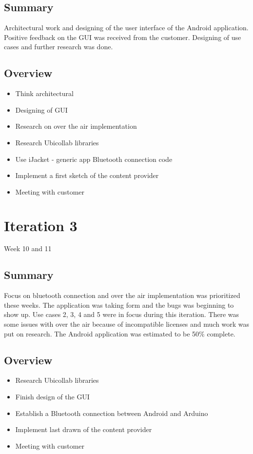 \subsection{Summary}
	Architectural work and designing of the user interface of the Android application. Positive feedback on the GUI was received from the customer. Designing of use cases and further research was done.
\subsection{Overview}
\begin{itemize}
	\item{Think architectural}
	\item{Designing of GUI}
	\item{Research on over the air implementation}
	\item{Research Ubicollab libraries}
	\item{Use iJacket - generic app Bluetooth connection code}
	\item{Implement a first sketch of the content provider}
	\item{Meeting with customer}
\end{itemize}

\section{Iteration 3}
Week 10 and 11
\subsection{Summary}
	Focus on bluetooth connection and over the air implementation was prioritized these weeks. The application was taking form and the bugs was beginning to show up. Use cases 2, 3, 4 and 5 were in focus during this iteration. There was some issues with over the air because of incompatible licenses and much work was put on research. The Android application was estimated to be 50\% complete.

\subsection{Overview}
\begin{itemize}
	\item{Research Ubicollab libraries}
	\item{Finish design of the GUI}
	\item{Establish a Bluetooth connection between Android and Arduino}
	\item{Implement last drawn of the content provider}
	\item{Meeting with customer}
\end{itemize}


